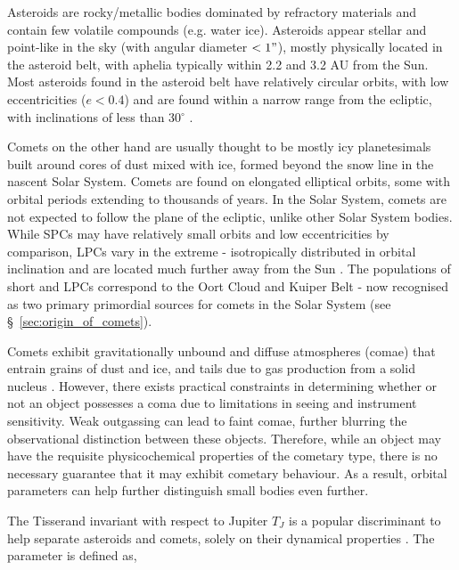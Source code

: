 Asteroids are rocky/metallic bodies dominated by refractory materials and contain few volatile compounds (e.g. water ice). Asteroids appear stellar and point-like in the sky (with angular diameter $< 1"$), mostly physically located in the asteroid belt, with aphelia typically within 2.2 and 3.2 AU from the Sun. Most asteroids found in the asteroid belt have relatively circular orbits, with low eccentricities ($e < 0.4$) and are found within a narrow range from the ecliptic, with inclinations of less than 30$^\circ$ \citep{2002AJ....123.2070T}. 

Comets on the other hand are usually thought to be mostly icy planetesimals built around cores of dust mixed with ice, formed beyond the snow line in the nascent Solar System. Comets are found on elongated elliptical orbits, some with orbital periods extending to thousands of years. In the Solar System, comets are not expected to follow the plane of the ecliptic, unlike other Solar System bodies. While SPCs may have relatively small orbits and low eccentricities by comparison, LPCs vary in the extreme - isotropically distributed in orbital inclination and are located much further away from the Sun \citep{DEMEO2008436}. The populations of short and LPCs correspond to the Oort Cloud and Kuiper Belt -  now recognised as two primary primordial sources for comets in the Solar System \citep{2017ApJ...845...27N} (see \S~\ref{sec:origin_of_comets}). 

Comets exhibit gravitationally unbound and diffuse atmospheres (comae) that entrain grains of dust and ice, and tails due to gas production from a solid nucleus \citep{1950ApJ...111..375W}. However, there exists practical constraints in determining whether or not an object possesses a coma due to limitations in seeing and instrument sensitivity. Weak outgassing can lead to faint comae, further blurring the observational distinction between these objects. Therefore, while an object may have the requisite physicochemical properties of the cometary type, there is no necessary guarantee that it may exhibit cometary behaviour. As a result, orbital parameters can help further distinguish small bodies even further.


The Tisserand invariant with respect to Jupiter $T_J$ is a popular discriminant to help separate asteroids and comets, solely on their dynamical properties \citep{1995EM&P...68...71C}. \clearpage The parameter is defined as,

